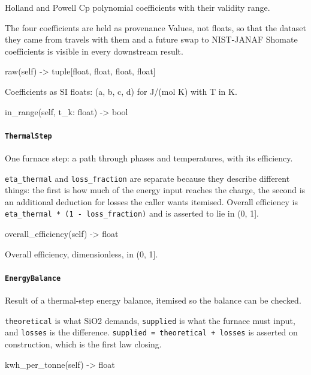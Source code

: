 \documentclass[10pt,a4paper,twoside]{report}
\begin{document}
Holland and Powell Cp polynomial coefficients with their validity range.

The four coefficients are held as provenance Values, not floats, so that the dataset they came from travels with them and a future swap to NIST-JANAF Shomate coefficients is visible in every downstream result.

\begin{verbatimsmall}
raw(self) -> tuple[float, float, float, float]
\end{verbatimsmall}

Coefficients as SI floats: (a, b, c, d) for J/(mol K) with T in K.

\begin{verbatimsmall}
in_range(self, t_k: float) -> bool
\end{verbatimsmall}

\paragraph{\texttt{ThermalStep}}

One furnace step: a path through phases and temperatures, with its efficiency.

\texttt{eta\_thermal} and \texttt{loss\_fraction} are separate because they describe different things: the first is how much of the energy input reaches the charge, the second is an additional deduction for losses the caller wants itemised. Overall efficiency is \texttt{eta\_thermal * (1 - loss\_fraction)} and is asserted to lie in (0, 1].

\begin{verbatimsmall}
overall_efficiency(self) -> float
\end{verbatimsmall}

Overall efficiency, dimensionless, in (0, 1].

\paragraph{\texttt{EnergyBalance}}

Result of a thermal-step energy balance, itemised so the balance can be checked.

\texttt{theoretical} is what SiO2 demands, \texttt{supplied} is what the furnace must input, and \texttt{losses} is the difference. \texttt{supplied = theoretical + losses} is asserted on construction, which is the first law closing.

\begin{verbatimsmall}
kwh_per_tonne(self) -> float
\end{verbatimsmall}
\end{document}
